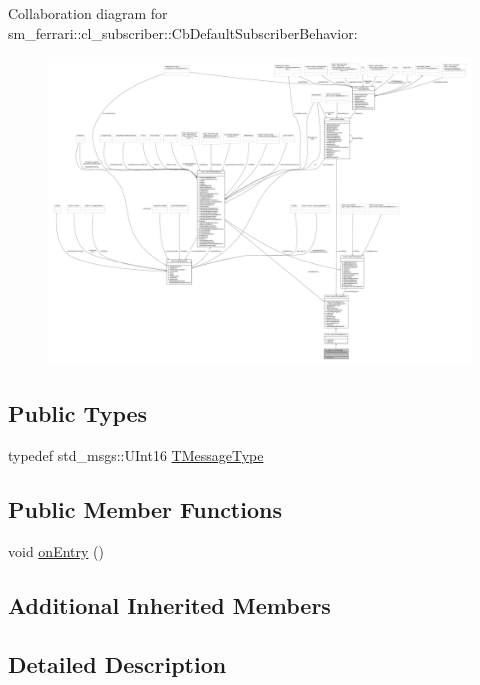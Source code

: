 Collaboration diagram for sm\+\_\+ferrari\+:\+:cl\+\_\+subscriber\+:\+:Cb\+Default\+Subscriber\+Behavior\+:
\nopagebreak
\begin{figure}[H]
\begin{center}
\leavevmode
\includegraphics[width=350pt]{classsm__ferrari_1_1cl__subscriber_1_1CbDefaultSubscriberBehavior__coll__graph}
\end{center}
\end{figure}
\subsection*{Public Types}
\begin{DoxyCompactItemize}
\item 
typedef std\+\_\+msgs\+::\+U\+Int16 \hyperlink{classsm__ferrari_1_1cl__subscriber_1_1CbDefaultSubscriberBehavior_aba9a136e495bc7b886a03af535a6bd5e}{T\+Message\+Type}
\end{DoxyCompactItemize}
\subsection*{Public Member Functions}
\begin{DoxyCompactItemize}
\item 
void \hyperlink{classsm__ferrari_1_1cl__subscriber_1_1CbDefaultSubscriberBehavior_a963465361108d96e1dbfd7c26c6b1043}{on\+Entry} ()
\end{DoxyCompactItemize}
\subsection*{Additional Inherited Members}


\subsection{Detailed Description}


